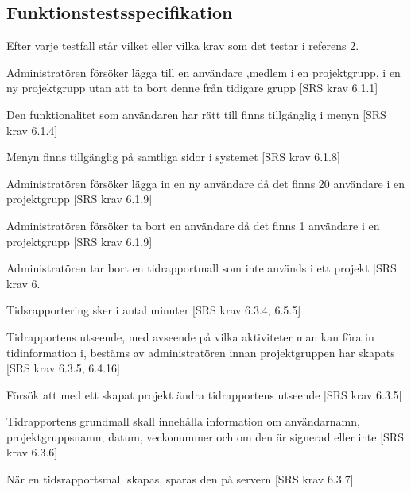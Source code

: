 \documentclass[a4paper]{article}
\begin{document}
\newpage

\begin{appendices}

\section{Funktionstestsspecifikation}
Efter varje testfall står vilket eller vilka krav som det testar i referens 2.

\begin{FT}


\item
Administratören försöker lägga till en användare ,medlem i en projektgrupp, i en ny projektgrupp utan att ta bort denne från tidigare grupp [SRS krav 6.1.1]

\item
Den funktionalitet som användaren har rätt till finns tillgänglig i menyn [SRS krav 6.1.4]

\item
Menyn finns tillgänglig på samtliga sidor i systemet [SRS krav 6.1.8]

\item
Administratören försöker lägga in en ny användare då det finns 20 användare i en projektgrupp [SRS krav 6.1.9]

\item
Administratören försöker ta bort en användare då det finns 1 användare i en projektgrupp [SRS krav 6.1.9]

\item
Administratören tar bort en tidrapportmall som inte används i ett projekt [SRS krav 6.
\item
Tidsrapportering sker i antal minuter [SRS krav 6.3.4, 6.5.5]

\item
Tidrapportens utseende, med avseende på vilka aktiviteter man kan föra in tidinformation i, bestäms av administratören innan projektgruppen har skapats [SRS krav 6.3.5, 6.4.16]

\item
Försök att med ett skapat projekt ändra tidrapportens utseende [SRS krav 6.3.5]

\item
Tidrapportens grundmall skall innehålla information om användarnamn, projektgruppsnamn, datum, veckonummer och om den är signerad eller inte [SRS krav 6.3.6]

\item
När en tidsrapportsmall skapas, sparas den på servern [SRS krav 6.3.7]


\end{FT}
\end{appendices}
\end{document}
